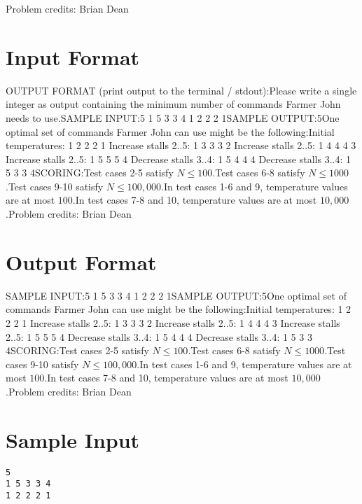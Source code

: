 \documentclass[12pt]{article}
\begin{document}
Problem credits: Brian Dean



\section*{Input Format}
OUTPUT FORMAT (print output to the terminal / stdout):Please write a single integer as output containing the minimum number of
commands Farmer John needs to use.SAMPLE INPUT:5
1 5 3 3 4
1 2 2 2 1SAMPLE OUTPUT:5One optimal set of commands Farmer John can use might be the following:Initial temperatures: 1 2 2 2 1
Increase stalls 2..5: 1 3 3 3 2
Increase stalls 2..5: 1 4 4 4 3
Increase stalls 2..5: 1 5 5 5 4
Decrease stalls 3..4: 1 5 4 4 4
Decrease stalls 3..4: 1 5 3 3 4SCORING:Test cases 2-5 satisfy $N \leq 100$.Test cases 6-8 satisfy $N \leq 1000$.Test cases 9-10 satisfy $N \leq 100,000$.In test cases 1-6 and 9, temperature values are at most $100$.In test cases 7-8 and 10, temperature values are at most $10,000$.Problem credits: Brian Dean

\section*{Output Format}
SAMPLE INPUT:5
1 5 3 3 4
1 2 2 2 1SAMPLE OUTPUT:5One optimal set of commands Farmer John can use might be the following:Initial temperatures: 1 2 2 2 1
Increase stalls 2..5: 1 3 3 3 2
Increase stalls 2..5: 1 4 4 4 3
Increase stalls 2..5: 1 5 5 5 4
Decrease stalls 3..4: 1 5 4 4 4
Decrease stalls 3..4: 1 5 3 3 4SCORING:Test cases 2-5 satisfy $N \leq 100$.Test cases 6-8 satisfy $N \leq 1000$.Test cases 9-10 satisfy $N \leq 100,000$.In test cases 1-6 and 9, temperature values are at most $100$.In test cases 7-8 and 10, temperature values are at most $10,000$.Problem credits: Brian Dean

\section*{Sample Input}
\begin{verbatim}
5
1 5 3 3 4
1 2 2 2 1
\end{verbatim}
\end{document}
